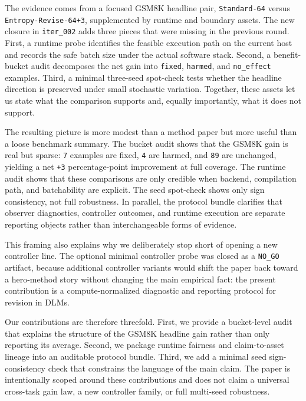 \documentclass{article}
\begin{document}
The evidence comes from a focused GSM8K headline pair, \texttt{Standard-64} versus \texttt{Entropy-Revise-64+3}, supplemented by runtime and boundary assets. The new closure in \texttt{iter\_002} adds three pieces that were missing in the previous round. First, a runtime probe identifies the feasible execution path on the current host and records the safe batch size under the actual software stack. Second, a benefit-bucket audit decomposes the net gain into \texttt{fixed}, \texttt{harmed}, and \texttt{no\_effect} examples. Third, a minimal three-seed spot-check tests whether the headline direction is preserved under small stochastic variation. Together, these assets let us state what the comparison supports and, equally importantly, what it does not support.

The resulting picture is more modest than a method paper but more useful than a loose benchmark summary. The bucket audit shows that the GSM8K gain is real but sparse: \texttt{7} examples are fixed, \texttt{4} are harmed, and \texttt{89} are unchanged, yielding a net \texttt{+3} percentage-point improvement at full coverage. The runtime audit shows that these comparisons are only credible when backend, compilation path, and batchability are explicit. The seed spot-check shows only sign consistency, not full robustness. In parallel, the protocol bundle clarifies that observer diagnostics, controller outcomes, and runtime execution are separate reporting objects rather than interchangeable forms of evidence.

This framing also explains why we deliberately stop short of opening a new controller line. The optional minimal controller probe was closed as a \texttt{NO\_GO} artifact, because additional controller variants would shift the paper back toward a hero-method story without changing the main empirical fact: the present contribution is a compute-normalized diagnostic and reporting protocol for revision in DLMs.

Our contributions are therefore threefold. First, we provide a bucket-level audit that explains the structure of the GSM8K headline gain rather than only reporting its average. Second, we package runtime fairness and claim-to-asset lineage into an auditable protocol bundle. Third, we add a minimal seed sign-consistency check that constrains the language of the main claim. The paper is intentionally scoped around these contributions and does not claim a universal cross-task gain law, a new controller family, or full multi-seed robustness.
\end{document}

